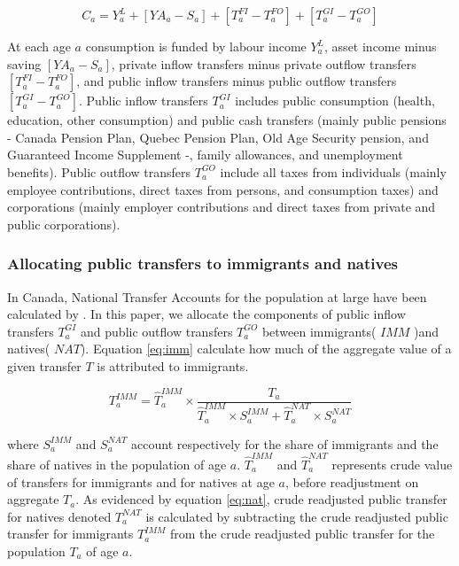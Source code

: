 \begin{equation}\label{eq:1}
  C_a = Y^L_a+[YA_a-S_a]+[T^{FI}_a-T^{FO}_a]+[T^{GI}_a-T^{GO}_a]
\end{equation}

At each age \(a\) consumption is funded by labour income \(Y^L_a\), asset income minus saving \([YA_a-S_a]\), private inflow transfers minus private outflow transfers \([T^{FI}_a-T^{FO}_a]\), and public inflow transfers minus public outflow transfers \([T^{GI}_a-T^{GO}_a]\).
Public inflow transfers \(T^{GI}_a\) includes public consumption (health, education, other consumption) and public cash transfers (mainly public pensions - Canada Pension Plan, Quebec Pension Plan, Old Age Security pension, and Guaranteed Income Supplement -, family allowances, and unemployment benefits).
Public outflow transfers  \(T^{GO}_a\) include all taxes from individuals (mainly employee contributions, direct taxes from persons, and consumption taxes) and corporations (mainly employer contributions and direct taxes from private and public corporations).

\subsubsection*{Allocating public transfers to immigrants and natives}

In Canada, National Transfer Accounts for the population at large have been calculated by \citet{Merette:2019kz}.
In this paper, we allocate the components of public inflow transfers \(T^{GI}_a\) and public outflow transfers \(T^{GO}_a\) between immigrants( \(IMM\) )and natives( \(NAT\)).
Equation \eqref{eq:imm} calculate how much of the aggregate value of a given transfer \(T\) is attributed to immigrants.

\begin{equation}\label{eq:imm}
 {T}^{IMM}_a = \hat{T}^{IMM}_a \times \frac{{T}_a}{\hat{T}^{IMM}_a \times S^{IMM}_a + \hat{T}^{NAT}_a \times S^{NAT}_a}
\end{equation}

where \( S^{IMM}_a \) and \( S^{NAT}_a \) account respectively for the share of immigrants and the share of natives in the population of age \(a\). \(\hat{T}^{IMM}_a \) and \( \hat{T}^{NAT}_a\) represents crude value of transfers for immigrants and for natives at age \(a\), before readjustment on aggregate \({T}_a \).
As evidenced by equation \eqref{eq:nat}, crude readjusted public transfer for natives denoted \({T}^{NAT}_a \)  is calculated by subtracting the crude readjusted public transfer for immigrants \({T}^{IMM}_a \) from the crude readjusted public transfer for the population \({T}_a \) of age \(a\).

